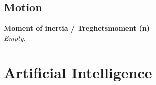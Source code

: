 \documentclass[12pt]{report}
\begin{document}
\section{Motion}
\textbf{Moment of inertia / Treghetsmoment (n)} \\
\textit{Empty.}

\chapter{Artificial Intelligence}






    





\printindex


\raggedright                    %
\sloppy
\printbibliography[heading=bibintoc,title={Bibliography}]
\end{document}
